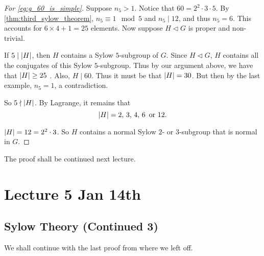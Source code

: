 \documentclass[notoc,notitlepage]{tufte-book}
\begin{document}
\begin{proof}[For \cref{eg:g_60_is_simple}]
  Suppose $n_5 > 1$. Notice that $60 = 2^2 \cdot 3 \cdot 5$. By \cref{thm:third_sylow_theorem},
  $n_5 \equiv 1 \mod 5$ and $n_5 \mid 12$, and thus $n_5 = 6$. This accounts for
  $6 \times 4 + 1 = 25$ elements. Now suppose $H \triangleleft G$ is proper and non-trivial.

  If $5 \mid \left| H \right|$, then $H$ contains a Sylow $5$-subgroup of $G$. Since
  $H \triangleleft G$, $H$ contains all the conjugates of this Sylow $5$-subgroup. Thus by
  our argument above, we have that $\left| H \right| \geq 25$ . Also, $H \mid 60$. Thus it must be that
  $\left| H \right| = 30$. But then by the last example, $n_5 = 1$, a contradiction.

  So $5 \nmid \left| H \right|$. By Lagrange, it remains that
  \begin{equation*}
    \left| H \right| = 2, \, 3, \, 4, \, 6\, \text{ or } 12.
  \end{equation*}

   $\left| H \right| = 12 = 2^2 \cdot 3$.
  So $H$ contains a normal Sylow $2$- or $3$-subgroup that is normal in $G$.
\end{proof}

The proof shall be continued next lecture.




\chapter{Lecture 5 Jan 14th}%
\label{chp:lecture_5_jan_14th}

\section{Sylow Theory (Continued 3)}%
\label{sec:sylow_theory_continued_3}

We shall continue with the last proof from where we left off.
\end{document}
